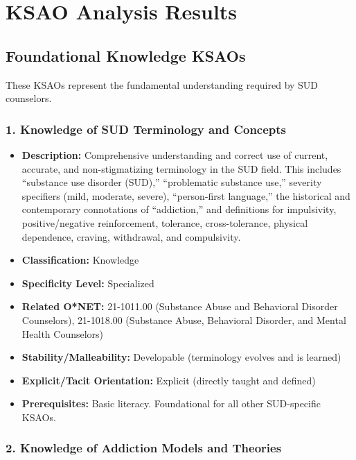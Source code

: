 \documentclass[
  letterpaper,
  DIV=11,
  numbers=noendperiod]{scrartcl}
\providecommand{\tightlist}{%
  \setlength{\itemsep}{0pt}\setlength{\parskip}{0pt}}
\begin{document}
\section{KSAO Analysis Results}\label{ksao-analysis-results}

\subsection{Foundational Knowledge
KSAOs}\label{foundational-knowledge-ksaos}

These KSAOs represent the fundamental understanding required by SUD
counselors.

\subsubsection{1. Knowledge of SUD Terminology and
Concepts}\label{knowledge-of-sud-terminology-and-concepts}

\begin{itemize}
\tightlist
\item
  \textbf{Description:} Comprehensive understanding and correct use of
  current, accurate, and non-stigmatizing terminology in the SUD field.
  This includes ``substance use disorder (SUD),'' ``problematic
  substance use,'' severity specifiers (mild, moderate, severe),
  ``person-first language,'' the historical and contemporary
  connotations of ``addiction,'' and definitions for impulsivity,
  positive/negative reinforcement, tolerance, cross-tolerance, physical
  dependence, craving, withdrawal, and compulsivity.
\item
  \textbf{Classification:} Knowledge
\item
  \textbf{Specificity Level:} Specialized
\item
  \textbf{Related O*NET:} 21-1011.00 (Substance Abuse and Behavioral
  Disorder Counselors), 21-1018.00 (Substance Abuse, Behavioral
  Disorder, and Mental Health Counselors)
\item
  \textbf{Stability/Malleability:} Developable (terminology evolves and
  is learned)
\item
  \textbf{Explicit/Tacit Orientation:} Explicit (directly taught and
  defined)
\item
  \textbf{Prerequisites:} Basic literacy. Foundational for all other
  SUD-specific KSAOs.
\end{itemize}

\subsubsection{2. Knowledge of Addiction Models and
Theories}\label{knowledge-of-addiction-models-and-theories}
\end{document}
